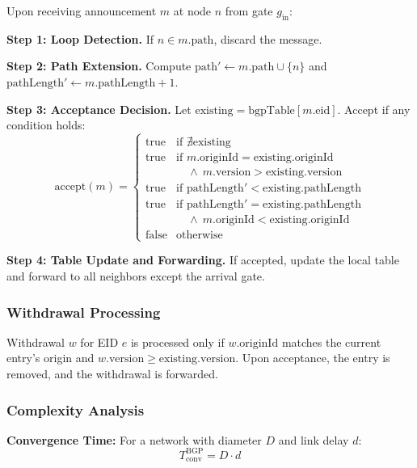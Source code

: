 \documentclass[journal,twocolumn]{IEEEtran}
\begin{document}
Upon receiving announcement $m$ at node $n$ from gate $g_{\text{in}}$:

\textbf{Step 1: Loop Detection.} If $n \in m.\text{path}$, discard the message.

\textbf{Step 2: Path Extension.} Compute $\text{path}' \leftarrow m.\text{path} \cup \{n\}$ and $\text{pathLength}' \leftarrow m.\text{pathLength} + 1$.

\textbf{Step 3: Acceptance Decision.} Let $\text{existing} = \text{bgpTable}[m.\text{eid}]$. Accept if any condition holds:
\begin{equation}
\text{accept}(m) = \begin{cases}
\text{true} & \text{if } \nexists \text{existing} \\
\text{true} & \text{if } m.\text{originId} = \text{existing}.\text{originId} \\
           & \quad \land\ m.\text{version} > \text{existing}.\text{version} \\
\text{true} & \text{if } \text{pathLength}' < \text{existing}.\text{pathLength} \\
\text{true} & \text{if } \text{pathLength}' = \text{existing}.\text{pathLength} \\
           & \quad \land\ m.\text{originId} < \text{existing}.\text{originId} \\
\text{false} & \text{otherwise}
\end{cases}
\end{equation}

\textbf{Step 4: Table Update and Forwarding.} If accepted, update the local table and forward to all neighbors except the arrival gate.

\subsubsection{Withdrawal Processing}

Withdrawal $w$ for EID $e$ is processed only if $w.\text{originId}$ matches the current entry's origin and $w.\text{version} \geq \text{existing}.\text{version}$. 
Upon acceptance, the entry is removed, and the withdrawal is forwarded.

\subsubsection{Complexity Analysis}

\textbf{Convergence Time:} For a network with diameter $D$ and link delay $d$:
\begin{equation}
T_{\text{conv}}^{\text{BGP}} = D \cdot d
\end{equation}
\end{document}
